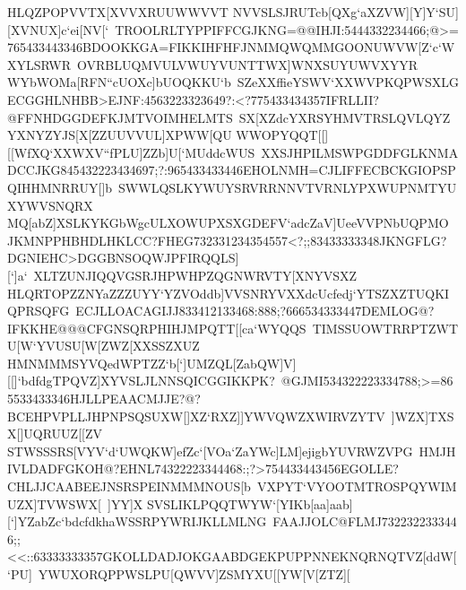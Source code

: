{{{ HLQZPOPVVTX[XVVXRUUWWVVT}
 \hbox{NVVSLSJRUTcb[QXg`aXZVW][Y]Y`SU][XVNUX]c`ei[NV[`%
 TROOLRLTYPPIFFCGJKNG=@@IHJI:5444332234466;@>=765433443346BDOOKKGA=FIKKIHFHFJNMMQWQMMGOONUWVW[Z`c`WXYLSRWR%
 OVRBLUQMVULVWUYVUNTTWX]WNXSUYUWVXYYR}
 \hbox{WYbWOMa[RFN``cUOXc]bUOQKKU`b%
 SZeXXffieYSWV`XXWVPKQPWSXLGECGGHLNHBB>EJNF:4563223323649?:<?775433434357IFRLLII?@FFNHDGGDEFKJMTVOIMHELMTS%
 SX[XZdcYXRSYHMVTRSLQVLQYZYXNYZYJS[X[ZZUUVVUL]XPWW[QU}
 \hbox{WWOPYQQT[[][[WfXQ`XXWXV``fPLU]ZZb]U[`MUddcWUS%
 XXSJHPILMSWPGDDFGLKNMADCCJKG845432223434697;?:965433433446EHOLNMH=CJLIFFECBCKGIOPSPQIHHMNRRUY[]b%
 SWWLQSLKYWUYSRVRRNNVTVRNLYPXWUPNMTYUXYWVSNQRX}
 \hbox{MQ[abZ]XSLKYKGbWgcULXOWUPXSXGDEFV`adcZaV]UeeVVPNbUQPMO%
 JKMNPPHBHDLHKLCC?FHEG732331234354557<?;;83433333348JKNGFLG?DGNIEHC>DGGBNSOQWJPFIRQQLS][`]a`%
 XLTZUNJIQQVGSRJHPWHPZQGNWRVTY[XNYVSXZ}
 \hbox{HLQRTOPZZNYaZZZUYY`YZVOddb]VVSNRYVXXdcUcfedj`YTSZXZTUQKIQPRSQFG%
 ECJLLOACAGIJJ833412133468:888;?666534333447DEMLOG@?IFKKHE@@@CFGNSQRPHIHJMPQTT[[ca`WYQQS%
 TIMSSUOWTRRPTZWTU[W`YVUSU[W[ZWZ[XXSSZXUZ}
 \hbox{HMNMMMSYVQedWPTZZ`b[`]UMZQL[ZabQW]V][[]`bdfdgTPQVZ]XYVSLJLNNSQICGGIKKPK?%
 @GJMI534322223334788;>=865533433346HJLLPEAACMJJE?@?BCEHPVPLLJHPNPSQSUXW[]XZ`RXZ]]YWVQWZXWIRVZYTV%
 ]WZX]TXSX[]UQRUUZ[[ZV}
 \hbox{STWSSSRS[VYV`d`UWQKW]efZc`[VOa`ZaYWc]LM]ejigbYUVRWZVPG%
 HMJHIVLDADFGKOH@?EHNL74322223344468:;?>754433443456EGOLLE?CHLJJCAABEEJNSRSPEINMMMNOUS[b%
 VXPYT`VYOOTMTROSPQYWIMUZX]TVWSWX[%
 ]YY]X}
 \hbox{SVSLIKLPQQTWYW`[YIKb[aa]aab][`]YZabZc`bdcfdkhaWSSRPYWRIJKLLMLNG%
 FAAJJOLC@FLMJ7322322333446;;<<::63333333357GKOLLDADJOKGAABDGEKPUPPNNEKNQRNQTVZ[ddW[`PU]%
 YWUXORQPPWSLPU[QWVV]ZSMYXU[[YW[V[ZTZ][}
}}
